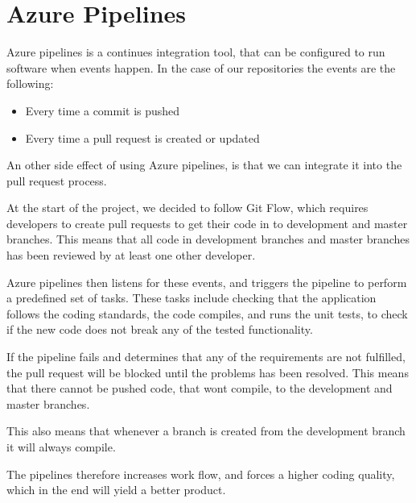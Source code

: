 \section{Azure Pipelines}
Azure pipelines is a continues integration tool, that can be configured to run software when events happen.
In the case of our repositories the events are the following:
\begin{itemize}
    \item Every time a commit is pushed
    \item Every time a pull request is created or updated
\end{itemize}

An other side effect of using Azure pipelines, is that we can integrate it into the pull request process.

At the start of the project, we decided to follow Git Flow, which requires developers to create pull requests to get their code in to development and master branches.
This means that all code in development branches and master branches has been reviewed by at least one other developer.

Azure pipelines then listens for these events, and triggers the pipeline to perform a predefined set of tasks.
These tasks include checking that the application follows the coding standards, the code compiles, and runs the unit tests, to check if the new code does not break any of the tested functionality. 

If the pipeline fails and determines that any of the requirements are not fulfilled, the pull request will be blocked until the problems has been resolved.
This means that there cannot be pushed code, that wont compile, to the development and master branches.

This also means that whenever a branch is created from the development branch it will always compile.

The pipelines therefore increases work flow, and forces a higher coding quality, which in the end will yield a better product.







